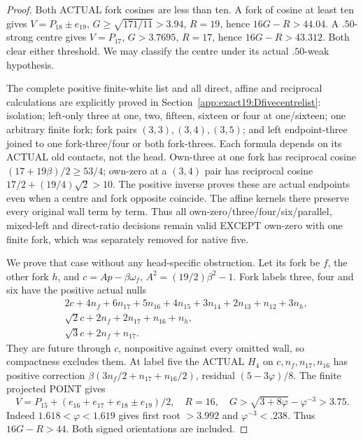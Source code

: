 \documentclass[11pt]{article}
\theoremstyle{definition}
\theoremstyle{remark}
\begin{document}
\begin{proof}
Both ACTUAL fork cosines are less than ten. A fork of cosine at least
ten gives \(V=P_{18}\pm e_{19}\), \(G\ge\sqrt{171/11}>3.94\), \(R=19\),
hence \(16G-R>44.04\).
A \(.50\)-strong centre gives \(V=P_{17}\), \(G>3.7695\), \(R=17\),
hence \(16G-R>43.312\). Both clear either threshold.
We may classify the centre under its actual \(.50\)-weak hypothesis.

The complete positive finite-white list and all direct, affine and
reciprocal calculations are explicitly proved in
Section~\ref{app:exact19:Dfivecentrelist}: isolation; left-only three at
one, two, fifteen, sixteen or four at one/sixteen; one arbitrary finite
fork; fork pairs \((3,3),(3,4),(3,5)\); and left endpoint-three joined
to one fork-three/four or both fork-threes.
Each formula depends on its ACTUAL old contacts, not the head.
Own-three at one fork has reciprocal cosine
\((17+19\beta)/2\ge53/4\); own-zero at a \((3,4)\) pair has reciprocal
cosine \(17/2+(19/4)\sqrt2>10\).
The positive inverse proves these are actual endpoints even when a
centre and fork opposite coincide.
The affine kernels there preserve every original wall term by term.
Thus all own-zero/three/four/six/parallel, mixed-left and direct-ratio
decisions remain valid EXCEPT own-zero with one finite fork, which was
separately removed for native five.

We prove that case without any head-specific obstruction.
Let its fork be \(f\), the other fork \(h\), and
\(c=Ap-\beta\omega_f\), \(A^2=(19/2)\beta^2-1\).
Fork labels three, four and six have the positive actual nulls
\[
\begin{split}
 &2c+4n_f+6n_{17}+5n_{16}+4n_{15}
                         +3n_{14}+2n_{13}+n_{12}+3n_h,\\
 &\sqrt2c+2n_f+2n_{17}+n_{16}+n_h,\\
 &\sqrt3c+2n_f+n_{17}.
\end{split}
\]
They are future through \(c\), nonpositive against every omitted wall,
so compactness excludes them. At label five the ACTUAL \(H_4\) on
\(c,n_f,n_{17},n_{16}\) has positive correction
\(\beta(3n_f/2+n_{17}+n_{16}/2)\), residual \((5-3\varphi)/8\).
The finite projected POINT gives
\[
 V=P_{15}+(e_{16}+e_{17}+e_{18}\pm e_{19})/2,\quad R=16,\quad
 G>\sqrt{3+8\varphi}-\varphi^{-3}>3.75 .
\]
Indeed \(1.618<\varphi<1.619\) gives first root \(>3.992\) and
\(\varphi^{-3}<.238\). Thus \(16G-R>44\).
Both signed orientations are included.


\end{proof}
\end{document}

